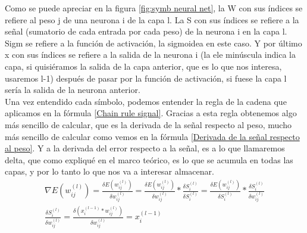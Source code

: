 Como se puede apreciar en la figura \ref{fig:symb neural net}, la W con sus índices se refiere al peso j de una neurona i de la capa l. La S  con sus índices se refiere a la señal (sumatorio de cada entrada por cada peso) de la neurona i en la capa l. Sigm se refiere a la función de activación, la sigmoidea en este caso. Y por último x con sus índices se refiere a la salida de la neurona i (la ele minúscula indica la capa, si quisiéramos la salida de la capa anterior, que es lo que nos interesa, usaremos l-1) después de pasar por la función de activación, si fuese la capa l sería la salida de la neurona anterior.
\\
Una vez entendido cada símbolo, podemos entender la regla de la cadena que aplicamos en la fórmula \ref{Chain rule signal}. Gracias a esta regla obtenemos algo más sencillo de calcular, que es la derivada de la señal respecto al peso, mucho más sencillo de calcular como vemos en la fórmula \ref{Derivada de la señal respecto al peso}. Y a la derivada del error respecto a la señal, es a lo que llamaremos delta, que como expliqué en el marco teórico, es lo que se acumula en todas las capas, y por lo tanto lo que nos va a interesar almacenar.
\begin{subequations}
	\begin{eqnarray}
		\nabla E(w_{ij}^{(l)}) =  \frac{\delta E(w_{ij}^{(l)})}{\delta w_{ij}^{(l)}} = \frac{\delta E(w_{ij}^{(l)})}{\delta w_{ij}^{(l)}} * \frac{\delta S_{i}^{(l)}}{\delta S_{i}^{(l)}} = \frac{\delta E(w_{ij}^{(l)})}{\delta S_{i}^{(l)}} * \frac{\delta S_{i}^{(l)}}{\delta w_{ij}^{(l)}} \label{Chain rule signal} \\
		\frac{\delta S_{i}^{(l)}}{\delta w_{ij}^{(l)}} = \frac{\delta (x_{i}^{(l-1)}*w_{ij}^{(l)}) }{\delta w_{ij}^{(l)}} = x_{i}^{(l-1)} \label{Derivada de la señal respecto al peso}
	\end{eqnarray}
\end{subequations}


